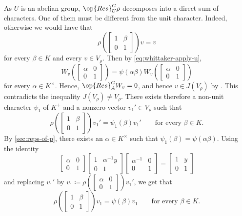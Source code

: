 \documentclass[../main.tex]{subfiles}
\begin{document}
As $U$ is an abelian group, $\op{Res}^G_U\rho$ decomposes into a direct sum of characters. One of them must be different from the unit character. Indeed, otherwise we would have that
\[\rho\left(\begin{bmatrix}
	1 & \beta \\
	0 & 1
\end{bmatrix}\right)v=v\]
for every $\beta\in K$ and every $v\in V_\rho$. Then by \eqref{eq:whittaker-apply-u},
\[W_v\left(\begin{bmatrix}
	\alpha & 0 \\
	0 & 1
\end{bmatrix}\right)=\psi(\alpha\beta)W_v\left(\begin{bmatrix}
	\alpha & 0 \\
	0 & 1
\end{bmatrix}\right)\]
for every $\alpha\in K^\times$. Hence, $\op{Res}^G_AW_v=0$, and hence $v\in J(V_\rho)$ by . This contradicts the inequality $J(V_\rho)\ne V_\rho$. There exists therefore a non-unit character $\psi_1$ of $K^+$ and a nonzero vector $v_1'\in V_\rho$ such that
\[\rho\left(\begin{bmatrix}
	1 & \beta \\
	0 & 1
\end{bmatrix}\right)v_1'=\psi_1(\beta)v_1'\qquad\text{for every }\beta\in K.\]
By \cref{sec:reps-of-p}, there exists an $\alpha\in K^\times$ such that $\psi_1(\beta)=\psi(\alpha\beta)$. Using the identity
\[\begin{bmatrix}
	\alpha & 0 \\
	0 & 1
\end{bmatrix}\begin{bmatrix}
	1 & \alpha^{-1}y \\
	0 & 1
\end{bmatrix}\begin{bmatrix}
	\alpha^{-1} & 0 \\
	0 & 1
\end{bmatrix}=\begin{bmatrix}
	1 & y \\
	0 & 1
\end{bmatrix}\]
and replacing $v_1'$ by $v_1\coloneqq\rho\left(\begin{bmatrix}
	\alpha & 0 \\
	0 & 1
\end{bmatrix}\right)v_1'$, we get that
\begin{equation}
	\rho\left(\begin{bmatrix}
		1 & \beta \\
		0 & 1
	\end{bmatrix}\right)v_1=\psi(\beta)v_1\qquad\text{for every }\beta\in K. \label{eq:v1-is-psi-eigen}
\end{equation}
\end{document}
